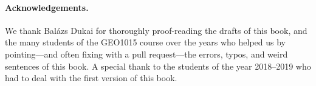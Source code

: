 \paragraph*{Acknowledgements.}
We thank Balázs Dukai for thoroughly proof-reading the drafts of this book, and the many students of the GEO1015 course over the years who helped us by pointing---and often fixing with a pull request---the errors, typos, and weird sentences of this book. 
A special thank to the students of the year 2018--2019 who had to deal with the first version of this book.






